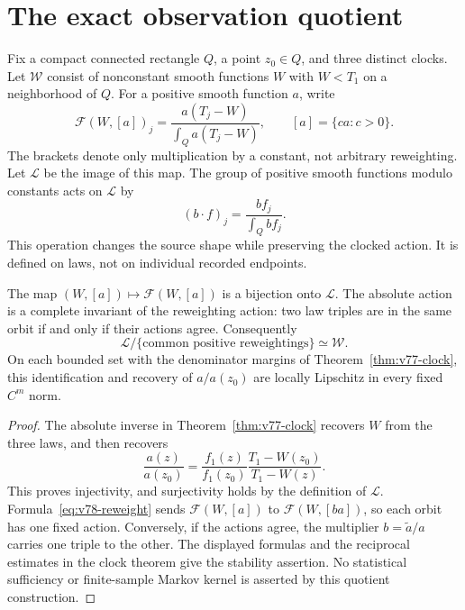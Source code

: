 \section{The exact observation quotient}
\label{sec:v78-information}

Fix a compact connected rectangle $Q$, a point $z_0\in Q$, and three
distinct clocks.  Let $\mathscr W$ consist of nonconstant smooth
functions $W$ with $W<T_1$ on a neighborhood of $Q$.  For a positive
smooth function $a$, write
\[
 \mathcal F(W,[a])_j=
 \frac{a(T_j-W)}{\int_Q a(T_j-W)},\qquad [a]=\{ca:c>0\}.
\]
The brackets denote only multiplication by a constant, not arbitrary
reweighting.  Let $\mathscr L$ be the image of this map.  The group of
positive smooth functions modulo constants acts on $\mathscr L$ by
\begin{equation}\label{eq:v78-reweight}
 (b\cdot f)_j=\frac{b f_j}{\int_Q b f_j}.
\end{equation}
This operation changes the source shape while preserving the clocked
action.  It is defined on laws, not on individual recorded endpoints.

\begin{theorem}
\label{thm:v78-quotient}
The map $(W,[a])\mapsto\mathcal F(W,[a])$ is a bijection onto
$\mathscr L$.  The absolute action is a complete invariant of the
reweighting action: two law triples are in the same orbit if and only
if their actions agree.  Consequently
\[
                 \mathscr L/\{\text{common positive reweightings}\}
                         \simeq \mathscr W.
\]
On each bounded set with the denominator margins of
Theorem~\ref{thm:v77-clock}, this identification and recovery of
$a/a(z_0)$ are locally Lipschitz in every fixed $C^m$ norm.
\end{theorem}
\begin{proof}
The absolute inverse in Theorem~\ref{thm:v77-clock} recovers $W$
from the three laws, and then recovers
\[
 \frac{a(z)}{a(z_0)}=
 \frac{f_1(z)}{f_1(z_0)}\frac{T_1-W(z_0)}{T_1-W(z)}.
\]
This proves injectivity, and surjectivity holds by the definition of
$\mathscr L$.  Formula~\eqref{eq:v78-reweight} sends
$\mathcal F(W,[a])$ to $\mathcal F(W,[ba])$, so each orbit has one
fixed action.  Conversely, if the actions agree, the multiplier
$b=\widetilde a/a$ carries one triple to the other.  The displayed
formulas and the reciprocal estimates in the clock theorem give the
stability assertion.  No statistical sufficiency or finite-sample
Markov kernel is asserted by this quotient construction.
\end{proof}

